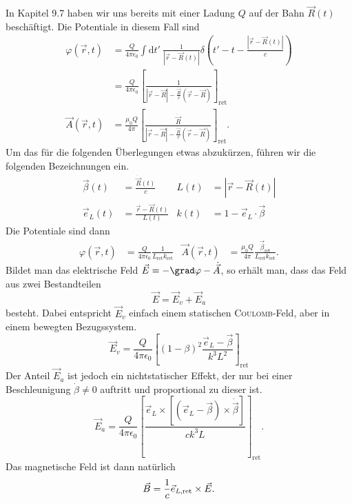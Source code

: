 In Kapitel 9.7 haben wir uns bereits mit einer Ladung $Q$ auf der Bahn $\vec{R}(t)$ beschäftigt. Die Potentiale in diesem Fall sind
\begin{align*}
\varphi(\vec{r},t) &= \frac{Q}{4\pi\epsilon_0} \int\mathrm{d}t'\ \frac{1}{|\vec{r}-\vec{R}(t)|}\delta\left(t'-t-\frac{|\vec{r}-\vec{R}(t)|}{c}\right)\\
&=\frac{Q}{4\pi\epsilon_0}
\left[\frac{1}{|\vec{r}-\vec{R}|-\frac{\dot{\vec{R}}}{c}(\vec{r}-\vec{R}) }\right]_\text{ret}\\
\vec{A}(\vec{r},t) &=\frac{\mu_0Q}{4\pi}
\left[\frac{\dot{\vec{R}}}{|\vec{r}-\vec{R}|-\frac{\dot{\vec{R}}}{c}(\vec{r}-\vec{R}) }\right]_\text{ret}.
\end{align*}
Um das für die folgenden Überlegungen etwas abzukürzen, führen wir die folgenden Bezeichnungen ein.
\begin{align*}
\vec{\beta}(t) &= \frac{\dot{\vec{R}}(t)}{c} & L(t)&=|\vec{r}-\vec{R}(t)|\\
\vec{e}_L(t) &=\frac{\vec{r}-\vec{R}(t)}{L(t)} &k(t) &=1-\vec{e}_L\cdot\vec{\beta}
\end{align*}
Die Potentiale sind dann
\begin{align*}
\varphi(\vec{r},t)&=\frac{Q}{4\pi\epsilon_0}\frac{1}{L_\text{ret}k_\text{ret}}
&\vec{A}(\vec{r},t) &= \frac{\mu_0 Q}{4\pi}\frac{\vec{\beta}_\text{ret}}{L_\text{ret}k_\text{ret}}.
\end{align*}
Bildet man das elektrische Feld $\vec{E}=-\grad\varphi -\dot{\vec{A}}$, so erhält man, dass das Feld aus zwei Bestandteilen 
\begin{equation*}
\vec{E} = \vec{E}_v + \vec{E}_a
\end{equation*}
besteht. Dabei entspricht $\vec{E}_v$ einfach einem statischen \textsc{Coulomb}-Feld, aber in einem bewegten Bezugssystem.
\begin{equation*}
\vec{E}_v = \frac{Q}{4\pi\epsilon_0}\left[(1-\beta)^2\frac{\vec{e}_L-\vec{\beta}}{k^3L^2}\right]_\text{ret}
\end{equation*}
Der Anteil $\vec{E}_a$ ist jedoch ein nichtstatischer Effekt, der nur bei einer Beschleunigung $\dot{\beta}\neq 0$ auftritt und proportional zu dieser ist.
\begin{equation*}
\vec{E}_a  =\frac{Q}{4\pi\epsilon_0}\left[\frac{\vec{e}_L\times\left[(\vec{e}_L-\vec{\beta})\times\dot{\vec{\beta}}\right]}{ck^3L}\right]_\text{ret}.
\end{equation*}
Das magnetische Feld ist dann natürlich
\begin{equation*}
\vec{B}=\frac{1}{c}\vec{e}_\text{\textit{L},ret}\times\vec{E}.
\end{equation*}
\ \\

